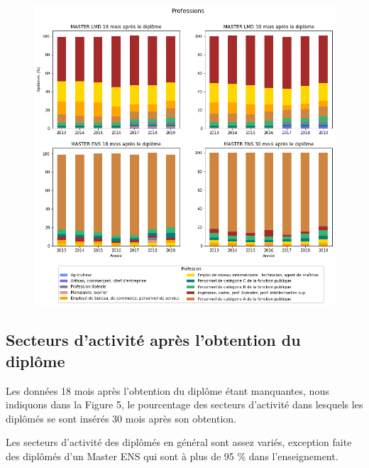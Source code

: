 \documentclass[12pt, a4paper, titlepage, table]{article}
\begin{document}
		\begin{figure}[H]
			\centering
			\includegraphics[width=1\textwidth]{../graphs/repartition_professions_situation_2.png}
			\label{fig:profession_pourcentage_2}
		\end{figure}


	\subsection{Secteurs d'activité après l'obtention du diplôme}
	Les données 18 mois après l'obtention du diplôme étant manquantes, nous indiquons dans la Figure 5, le pourcentage des secteurs d'activité dans lesquels les diplômés se sont insérés 30 mois après son obtention. 
	
	Les secteurs d'activité des diplômés en général sont assez variés, exception faite des diplômés d'un Master ENS qui sont à plus de 95 \% dans l'enseignement.
\end{document}
